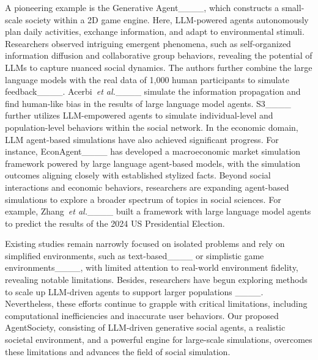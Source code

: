 A pioneering example is the Generative Agent____, which constructs a small-scale society within a 2D game engine. Here, LLM-powered agents autonomously plan daily activities, exchange information, and adapt to environmental stimuli. Researchers observed intriguing emergent phenomena, such as self-organized information diffusion and collaborative group behaviors, revealing the potential of LLMs to capture nuanced social dynamics. The authors further combine the large language models with the real data of 1,000 human participants to simulate feedback____. Acerbi~\textit{et al.}____ simulate the information propagation and find human-like bias in the results of large language model agents. 
 S3____ further utilizes LLM-empowered agents to simulate individual-level and population-level behaviors within the social network. In the economic domain, LLM agent-based simulations have also achieved significant progress. For instance, EconAgent____ has developed a macroeconomic market simulation framework powered by large language agent-based models, with the simulation outcomes aligning closely with established stylized facts. 
Beyond social interactions and economic behaviors, researchers are expanding agent-based simulations to explore a broader spectrum of topics in social sciences. For example, Zhang~\textit{et al.}____ built a framework with large language model agents to predict the results of the 2024 US Presidential Election.

Existing studies remain narrowly focused on isolated problems and rely on simplified environments, such as text-based____ or simplistic game environments____, with limited attention to real-world environment fidelity, revealing notable limitations. Besides, researchers have begun exploring methods to scale up LLM-driven agents to support larger populations ____. Nevertheless, these efforts continue to grapple with critical limitations, including computational inefficiencies and inaccurate user behaviors. Our proposed AgentSociety, consisting of LLM-driven generative social agents, a realistic societal environment, and a powerful engine for large-scale simulations, overcomes these limitations and advances the field of social simulation.


